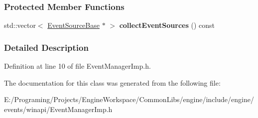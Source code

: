 \subsubsection*{Protected Member Functions}
\begin{DoxyCompactItemize}
\item 
std\+::vector$<$ \hyperlink{a00036}{Event\+Source\+Base} $\ast$ $>$ {\bfseries collect\+Event\+Sources} () const \hypertarget{a00034_a06d769343d241b827056389203e1dcb7}{}\label{a00034_a06d769343d241b827056389203e1dcb7}

\end{DoxyCompactItemize}


\subsubsection{Detailed Description}


Definition at line 10 of file Event\+Manager\+Imp.\+h.



The documentation for this class was generated from the following file\+:\begin{DoxyCompactItemize}
\item 
E\+:/\+Programing/\+Projects/\+Engine\+Workspace/\+Common\+Libs/engine/include/engine/events/winapi/Event\+Manager\+Imp.\+h\end{DoxyCompactItemize}
